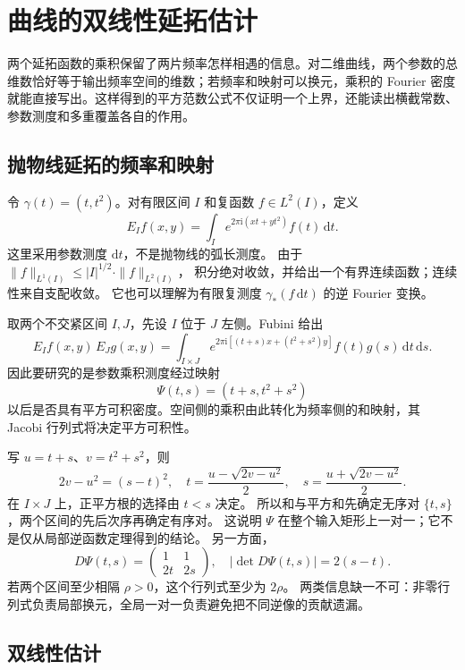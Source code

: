 \section{曲线的双线性延拓估计}
\label{b2:sec:2503}

两个延拓函数的乘积保留了两片频率怎样相遇的信息。对二维曲线，两个参数的总维数恰好等于输出频率空间的维数；若频率和映射可以换元，乘积的 Fourier 密度就能直接写出。这样得到的平方范数公式不仅证明一个上界，还能读出横截常数、参数测度和多重覆盖各自的作用。

\subsection{抛物线延拓的频率和映射}
\label{b2:subsec:250301}

令 \(\gamma(t)=(t,t^2)\)。对有限区间 \(I\) 和复函数
\(f\in L^2(I)\)，定义
\[
 E_If(x,y)=\int_I e^{2\pi\mathrm i(xt+yt^2)}f(t)\,\mathrm dt.
\]
这里采用参数测度 \(\mathrm dt\)，不是抛物线的弧长测度。
由于
\(\|f\|_{L^1(I)}\leq |I|^{1/2}\cdot\|f\|_{L^2(I)}\)，
积分绝对收敛，并给出一个有界连续函数；连续性来自支配收敛。
它也可以理解为有限复测度 \(\gamma_*(f\,\mathrm dt)\) 的逆 Fourier 变换。

取两个不交紧区间 \(I,J\)，先设 \(I\) 位于 \(J\) 左侧。Fubini 给出
\[
 E_If(x,y)\,E_Jg(x,y)
 =\int_{I\times J}
 e^{2\pi\mathrm i[(t+s)x+(t^2+s^2)y]}f(t)g(s)
 \,\mathrm dt\,\mathrm ds.
\]
因此要研究的是参数乘积测度经过映射
\[
 \Psi(t,s)=(t+s,t^2+s^2)
\]
以后是否具有平方可积密度。空间侧的乘积由此转化为频率侧的和映射，其 Jacobi 行列式将决定平方可积性。

\ProseParagraphBreak
写 \(u=t+s\)、\(v=t^2+s^2\)，则
\[
 2v-u^2=(s-t)^2,\quad
 t=\frac{u-\sqrt{2v-u^2}}2,\quad
 s=\frac{u+\sqrt{2v-u^2}}2.
\]
在 \(I\times J\) 上，正平方根的选择由 \(t<s\) 决定。
所以和与平方和先确定无序对 \(\{t,s\}\)，两个区间的先后次序再确定有序对。
这说明 \(\Psi\) 在整个输入矩形上一对一；它不是仅从局部逆函数定理得到的结论。
另一方面，
\[
 D\Psi(t,s)=
 \begin{pmatrix}1&1\\2t&2s\end{pmatrix},
 \quad
 |\det D\Psi(t,s)|=2(s-t).
\]
若两个区间至少相隔 \(\rho>0\)，这个行列式至少为 \(2\rho\)。
两类信息缺一不可：非零行列式负责局部换元，全局一对一负责避免把不同逆像的贡献遗漏。

\subsection{双线性估计}
\label{b2:subsec:250302}

